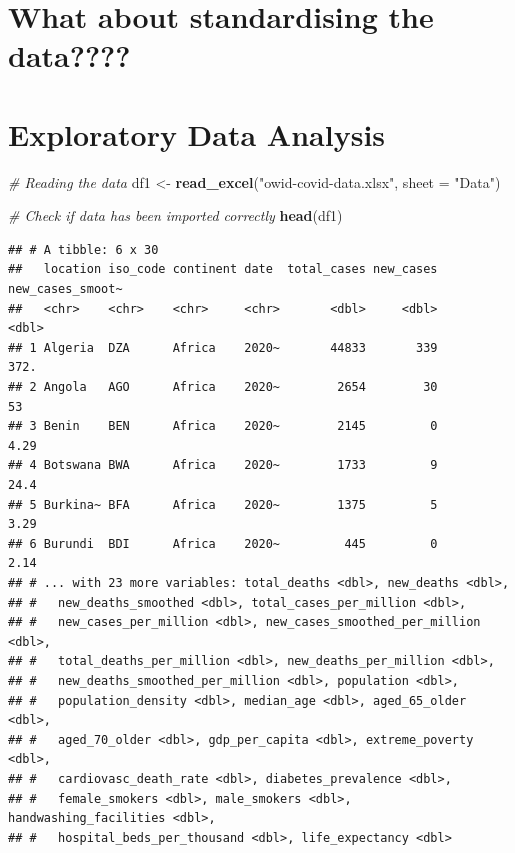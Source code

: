 \documentclass[
]{article}
\newenvironment{Shaded}{\begin{snugshade}}{\end{snugshade}}
\newcommand{\CommentTok}[1]{\textcolor[rgb]{0.56,0.35,0.01}{\textit{#1}}}
\newcommand{\DataTypeTok}[1]{\textcolor[rgb]{0.13,0.29,0.53}{#1}}
\newcommand{\KeywordTok}[1]{\textcolor[rgb]{0.13,0.29,0.53}{\textbf{#1}}}
\newcommand{\NormalTok}[1]{#1}
\newcommand{\StringTok}[1]{\textcolor[rgb]{0.31,0.60,0.02}{#1}}
\begin{document}
\pagebreak

\hypertarget{what-about-standardising-the-data}{%
\section{What about standardising the data????}\label{what-about-standardising-the-data}}

\hypertarget{exploratory-data-analysis}{%
\section{Exploratory Data Analysis}\label{exploratory-data-analysis}}

\begin{Shaded}
\begin{Highlighting}[]
\CommentTok{# Reading the data}
\NormalTok{df1 <-}\StringTok{ }\KeywordTok{read_excel}\NormalTok{(}\StringTok{"owid-covid-data.xlsx"}\NormalTok{, }\DataTypeTok{sheet =} \StringTok{"Data"}\NormalTok{)}

\CommentTok{# Check if data has been imported correctly}
\KeywordTok{head}\NormalTok{(df1) }
\end{Highlighting}
\end{Shaded}

\begin{verbatim}
## # A tibble: 6 x 30
##   location iso_code continent date  total_cases new_cases new_cases_smoot~
##   <chr>    <chr>    <chr>     <chr>       <dbl>     <dbl>            <dbl>
## 1 Algeria  DZA      Africa    2020~       44833       339           372.  
## 2 Angola   AGO      Africa    2020~        2654        30            53   
## 3 Benin    BEN      Africa    2020~        2145         0             4.29
## 4 Botswana BWA      Africa    2020~        1733         9            24.4 
## 5 Burkina~ BFA      Africa    2020~        1375         5             3.29
## 6 Burundi  BDI      Africa    2020~         445         0             2.14
## # ... with 23 more variables: total_deaths <dbl>, new_deaths <dbl>,
## #   new_deaths_smoothed <dbl>, total_cases_per_million <dbl>,
## #   new_cases_per_million <dbl>, new_cases_smoothed_per_million <dbl>,
## #   total_deaths_per_million <dbl>, new_deaths_per_million <dbl>,
## #   new_deaths_smoothed_per_million <dbl>, population <dbl>,
## #   population_density <dbl>, median_age <dbl>, aged_65_older <dbl>,
## #   aged_70_older <dbl>, gdp_per_capita <dbl>, extreme_poverty <dbl>,
## #   cardiovasc_death_rate <dbl>, diabetes_prevalence <dbl>,
## #   female_smokers <dbl>, male_smokers <dbl>, handwashing_facilities <dbl>,
## #   hospital_beds_per_thousand <dbl>, life_expectancy <dbl>
\end{verbatim}
\end{document}
